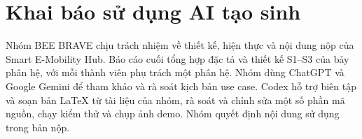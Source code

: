 \chapter{Khai báo sử dụng AI tạo sinh}
Nhóm BEE BRAVE chịu trách nhiệm về thiết kế, hiện thực và nội dung nộp của Smart E-Mobility Hub. Báo cáo cuối tổng hợp đặc tả và thiết kế S1--S3 của bảy phân hệ, với mỗi thành viên phụ trách một phân hệ. Nhóm dùng ChatGPT và Google Gemini để tham khảo và rà soát kịch bản use case. Codex hỗ trợ biên tập và soạn bản LaTeX từ tài liệu của nhóm, rà soát và chỉnh sửa một số phần mã nguồn, chạy kiểm thử và chụp ảnh demo. Nhóm quyết định nội dung sử dụng trong bản nộp.
